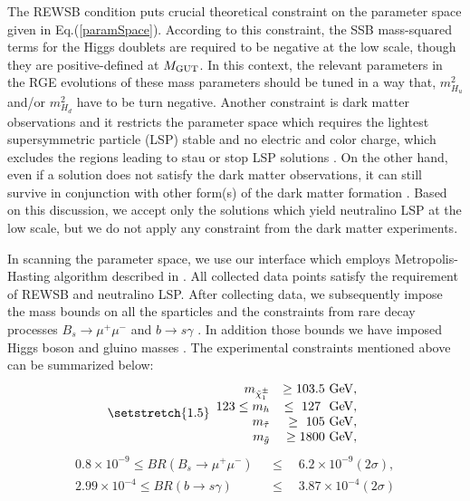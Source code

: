 \documentclass[12pt]{article}
\newcommand{\mgut}{M_{{\rm GUT}}}
\begin{document}
The REWSB condition puts crucial theoretical constraint \cite{Ibanez:Ross} on the parameter space given in Eq.(\ref{paramSpace}). According to this constraint, the SSB mass-squared terms for the Higgs doublets are required to be negative at the low scale, though they are positive-defined at $\mgut$. In this context, the relevant parameters in the RGE evolutions of these mass parameters should be tuned in a way that, $m_{H_{u}}^{2}$ and/or $m_{H_{d}}^{2}$ have to be turn negative. Another constraint is dark matter observations and it restricts the parameter space which requires the lightest supersymmetric particle (LSP) stable and no electric and color charge, which excludes the regions leading to stau or stop LSP solutions \cite{Nakamura:2010zzi}. On the other hand, even if a solution does not satisfy the dark matter observations, it can still survive in conjunction with other form(s) of the dark matter formation \cite{Baer:2012by}. Based on this discussion, we accept only the solutions which yield neutralino LSP at the low scale, but we do not apply any constraint from the dark matter experiments.

In scanning the parameter space, we use our interface which employs Metropolis-Hasting algorithm described in \cite{Belanger:2009ti}. All collected data points satisfy the requirement of REWSB and neutralino LSP. After collecting data, we subsequently impose the mass bounds on all 	the sparticles \cite{Agashe:2014kda} and the constraints from rare decay processes $B_s \rightarrow \mu^+ \mu^-$ \cite{Aaij:2012nna} and $b \rightarrow s \gamma$ \cite{Amhis:2012bh}. In addition those bounds we have imposed Higgs boson \cite{Aad:2012tfa} and gluino masses \cite{TheATLAScollaboration:2015aaa}. The experimental constraints mentioned above can be summarized below:
\begin{equation}
\setstretch{1.5}
\begin{array}{rr}
m_{\tilde{\chi}^{\pm}_{1}} & \geq  103.5~{\rm GeV}, \\
 123 \leq m_h & \leq ~ 127~~{\rm GeV}, \\
m_{\tilde \tau} & \geq ~ 105~{\rm GeV}, \\
m_{\tilde g} & \geq  1800~{\rm GeV}, \\
 \end{array}
\label{experimentalcons}
\end{equation}
\begin{equation*}
\begin{split}
0.8\times 10^{-9} \leq BR(B_s \rightarrow \mu^+ \mu^-)~~ & \leq \quad 6.2 \times 10^{-9} (2\sigma), \\
2.99\times 10^{-4} \leq BR(b \rightarrow s \gamma) ~~ & \leq \quad 3.87 \times 10^{-4} (2\sigma) \\
\end{split}
\end{equation*}
\end{document}
